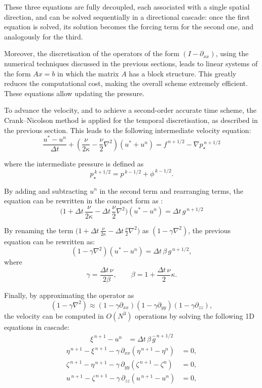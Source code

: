 \documentclass[12pt]{article}
\begin{document}
These three equations are fully decoupled, each associated with a single
spatial direction, and can be solved sequentially in a directional
cascade: once the first equation is solved, its solution becomes the
forcing term for the second one, and analogously for the third.

Moreover, the discretisation of the operators of the form
$(I - \partial_{xx})$, using the numerical techniques discussed in the
previous sections, leads to linear systems of the form $A x = b$ in
which the matrix $A$ has a block structure.  
This greatly reduces the computational cost, making the overall scheme
extremely efficient.
These equations allow updating the pressure. 


To advance the velocity, and to achieve a second-order accurate time scheme, 
the Crank--Nicolson method is applied for the temporal discretisation, 
as described in the previous section. This leads to the following intermediate 
velocity equation:
\[
\frac{u^{*} - u^n}{\Delta t} 
+ (\frac{\nu}{2\kappa}
- \frac{\nu}{2} \nabla^2 ) (u^{*} + u^n)
= f^{\,n+1/2} - \nabla p^{\,n+1/2}_{\star}
\]



where the intermediate pressure is defined as
\[
p^{\,k+1/2}_{\star} = p^{\,k-1/2} + \phi^{\,k-1/2}.
\]

By adding and subtracting $u^n$ in the second term and rearranging terms, 
the equation can be rewritten in the compact form as :
\[
\big( 1 + \Delta t \, \frac{\nu}{2\kappa} - \Delta t \, \frac{\nu}{2} \nabla^2 \big) 
(u^{*} - u^n) = \Delta t \, g^{\,n+1/2}
\]

By renaming the term $\big( 1 + \Delta t \, \frac{\nu}{2\kappa} - \Delta t \, \frac{\nu}{2} \nabla^2 \big)$   as $(1 - \gamma \nabla^2)$, 
the previous equation can be rewritten as:
\[
(1 - \gamma \nabla^2)(u^* - u^n) = \Delta t \, \beta \, g^{\,n+1/2},
\]
where 
\[
\gamma = \frac{\Delta t \, \nu}{2 \beta}, \qquad 
\beta = 1 + \frac{\Delta t \, \nu}{2} \kappa.
\]

Finally, by approximating the operator as 
\[
(1 - \gamma \nabla^2) \approx (1 - \gamma \partial_{xx}) (1 - \gamma \partial_{yy}) (1 - \gamma \partial_{zz}),
\]
the velocity can be computed in $O(N^3)$ operations by solving the following 1D equations in cascade:
\begin{align*}
 \xi^{\,n+1} - u^n &= \Delta t \, \beta \, \hat g^{\,n+1/2}
\end{align*}
\begin{align*}
\eta^{\,n+1} - \xi^{\,n+1} - \gamma \, \partial_{xx} (\eta^{\,n+1} - \eta^n) &= 0,\\
\zeta^{\,n+1} - \eta^{\,n+1} - \gamma \, \partial_{yy} (\zeta^{\,n+1} - \zeta^n) &= 0,\\
u^{\,n+1} - \zeta^{\,n+1} - \gamma \, \partial_{zz} (u^{\,n+1} - u^n) &= 0,
\end{align*}
\end{document}
